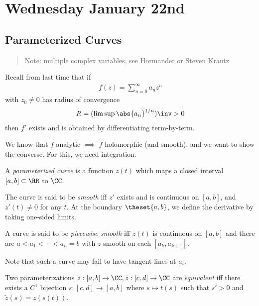 \hypertarget{wednesday-january-22nd}{%
\section{Wednesday January 22nd}\label{wednesday-january-22nd}}

\hypertarget{parameterized-curves}{%
\subsection{Parameterized Curves}\label{parameterized-curves}}

\begin{quote}
Note: multiple complex variables, see Hormander or Steven Krantz
\end{quote}

Recall from last time that if
\begin{align*}f(z) = \sum_{n=0}^\infty a_n z^n\end{align*} with
\(z_0 \neq 0\) has radius of convergence
\begin{align*}R = (\limsup \abs{a_n}^{1/n})\inv > 0\end{align*} then
\(f'\) exists and is obtained by differentiating term-by-term.

We know that \(f\) analytic \(\implies\) \(f\) holomorphic (and smooth),
and we want to show the converse. For this, we need integration.

\begin{description}
\tightlist
\item[Definition (Parameterized Curves)]
A \emph{parameterized curve} is a function \(z(t)\) which maps a closed
interval \([a, b] \subset \RR\) to \(\CC\).
\item[Definition (Smooth Curves)]
The curve is said to be \emph{smooth} iff \(z'\) exists and is
continuous on \([a,b]\), and \(z'(t) \neq 0\) for any \(t\). At the
boundary \(\theset{a, b}\), we define the derivative by taking one-sided
limits.
\item[Definition (Piecewise Smooth Curves)]
A curve is said to be \emph{piecewise smooth} iff \(z(t)\) is continuous
on \([a, b]\) and there are \(a < a_1 < \cdots < a_n = b\) with \(z\)
smooth on each \([a_k, a_{k+1}]\).
\end{description}

Note that such a curve may fail to have tangent lines at \(a_i\).

\begin{description}
\tightlist
\item[Definition (Equivalent Parameterizations)]
Two parameterizations \(z: [a,b] \to \CC, \tilde z: [c, d] \to \CC\) are
\emph{equivalent} iff there exists a \(C^1\) bijection
\(s: [c, d] \to [a, b]\) where \(s \mapsto t(s)\) such that \(s'>0\) and
\(\tilde z(s) = z(s(t))\).
\end{description}

